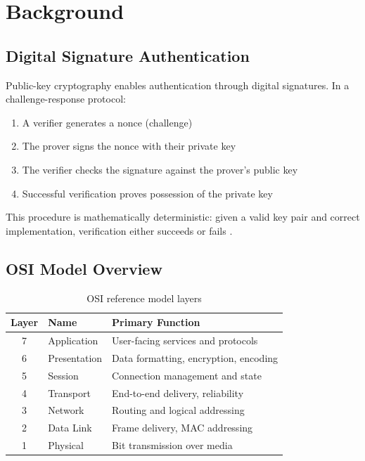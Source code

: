 \documentclass[11pt,a4paper]{article}
\begin{document}
\section{Background}

\subsection{Digital Signature Authentication}

Public-key cryptography enables authentication through digital signatures. In a challenge-response protocol:

\begin{enumerate}
    \item A verifier generates a nonce (challenge)
    \item The prover signs the nonce with their private key
    \item The verifier checks the signature against the prover's public key
    \item Successful verification proves possession of the private key
\end{enumerate}

This procedure is mathematically deterministic: given a valid key pair and correct implementation, verification either succeeds or fails \citep{diffie1976}.

\subsection{OSI Model Overview}

\begin{table}[h]
\centering
\caption{OSI reference model layers \citep{iso1994}}
\begin{tabular}{@{}cll@{}}
\toprule
\textbf{Layer} & \textbf{Name} & \textbf{Primary Function} \\
\midrule
7 & Application & User-facing services and protocols \\
6 & Presentation & Data formatting, encryption, encoding \\
5 & Session & Connection management and state \\
4 & Transport & End-to-end delivery, reliability \\
3 & Network & Routing and logical addressing \\
2 & Data Link & Frame delivery, MAC addressing \\
1 & Physical & Bit transmission over media \\
\bottomrule
\end{tabular}
\end{table}
\end{document}
